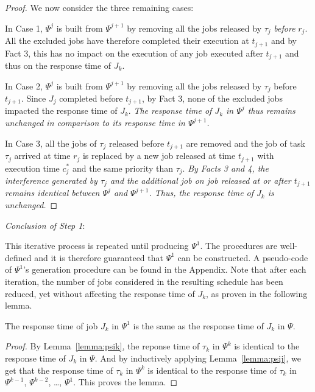 \begin{proof}
We now consider the three remaining cases:

\noindent In Case 1, $\Psi^j$ is built from $\Psi^{j+1}$ by removing all the jobs released by $\tau_j$ \emph{before} $r_j$.  All the excluded jobs have therefore completed their execution at $t_{j+1}$ and by Fact 3, this has no impact on the execution of any job executed after $t_{j+1}$ and thus on the response time of $J_k$.

\noindent In Case 2, $\Psi^j$ is built from $\Psi^{j+1}$ by removing all the jobs released by $\tau_j$ before $t_{j+1}$. Since $J_{j}$ completed before $t_{j+1}$, by Fact 3, none of the excluded jobs impacted the response time of $J_k$. \emph{The response time of $J_{k}$ in $\Psi^j$ thus remains unchanged in comparison to its response time in $\Psi^{j+1}$.}

\noindent In Case 3, all the jobs of $\tau_j$ released before $t_{j+1}$ are removed and the job of task $\tau_j$ arrived at time $r_j$ is replaced by a new job released at time $t_{j+1}$ with execution time $c_j^*$ and the same priority than $\tau_j$. \emph{By Facts 3 and 4, the interference generated by $\tau_j$ and the additional job on job released at or after $t_{j+1}$ remains identical between $\Psi^j$ and $\Psi^{j+1}$. Thus, the response time of $J_k$ is unchanged.} 
\end{proof}

 
\noindent\textit{Conclusion of Step 1}:

This iterative process is repeated until producing $\Psi^1$. The procedures are well-defined and it is therefore guaranteed that $\Psi^1$ can be constructed. A pseudo-code of $\Psi^1$'s generation procedure can be found in the Appendix\citetechreport{}. Note that after each iteration, the number of jobs considered in the resulting schedule has been reduced, yet without affecting the response time of $J_k$, as proven in the following lemma.

 \begin{Lemma}
\label{lem:step-1-conclusion}
 The response time of job $J_k$ in $\Psi^1$ is the same as the response time of $J_k$ in $\Psi$.
\end{Lemma}
\begin{proof}
  By Lemma~\ref{lemma:psik}, the reponse time of $\tau_k$ in $\Psi^k$ is identical to the response time of $J_k$ in $\Psi$. And by inductively applying Lemma~\ref{lemma:psij}, we get that the response time of $\tau_k$ in $\Psi^k$ is identical to the response time of $\tau_k$ in $\Psi^{k-1}$, $\Psi^{k-2}$, \ldots, $\Psi^{1}$. This proves the lemma.
\end{proof}



